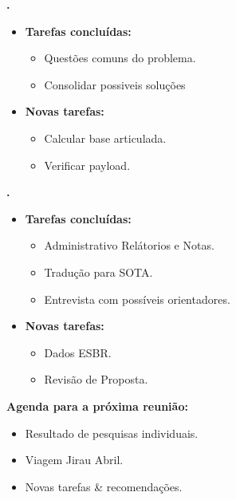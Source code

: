 \textbf{\gabriel.} 
	\begin{itemize}
		\item \textbf{Tarefas concluídas:}
			\begin{itemize}    
				\item Questões comuns do problema.
				\item Consolidar possiveis soluções 
			\end{itemize}
		\item \textbf{Novas tarefas:}
			\begin{itemize}
				\item Calcular base articulada.
				\item Verificar payload.		
			\end{itemize}
	\end{itemize}
	
\textbf{\julia.} 
	\begin{itemize}
		\item \textbf{Tarefas concluídas:}
			\begin{itemize}    
				\item Administrativo Relátorios e Notas.
				\item Tradução para SOTA.
				\item Entrevista com possíveis orientadores.
			\end{itemize}
		\item \textbf{Novas tarefas:}
			\begin{itemize}
				\item Dados ESBR.
				\item Revisão de Proposta.		
			\end{itemize}
	\end{itemize}

\textbf{Agenda para a próxima reunião:}
  \begin{itemize}
    \item Resultado de pesquisas individuais.
    \item Viagem Jirau Abril.
    \item Novas tarefas \& recomendações.
  \end{itemize}

